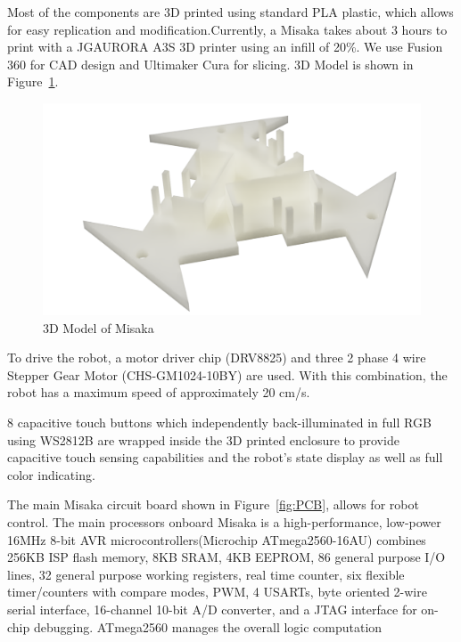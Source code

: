 \documentclass[conference]{IEEEtran}
\begin{document}
Most of the components are 3D printed using standard PLA plastic, which allows for easy replication and modification.Currently, a Misaka takes about 3 hours to print with a JGAURORA A3S 3D printer using an infill of 20\%. We use Fusion 360 for CAD design and Ultimaker Cura for slicing. 3D Model is shown in Figure~\ref{fig:3DModel}.

\begin{figure}[htbp]
    \centering
    \includegraphics[width=\columnwidth]{3DModel.png}
    \caption{3D Model of Misaka}
    \label{fig:3DModel}
\end{figure}

To drive the robot, a motor driver chip (DRV8825) and three 2 phase 4 wire Stepper Gear Motor (CHS-GM1024-10BY) are used. With this combination, the robot has a maximum speed of approximately 20 cm/s.

8 capacitive touch buttons which independently back-illuminated in full RGB using WS2812B are wrapped inside the 3D printed enclosure to provide capacitive touch sensing capabilities and the robot’s state display as well as full color indicating.

The main Misaka circuit board shown in Figure~\ref{fig:PCB}, allows for robot control. The main processors onboard Misaka is a high-performance, low-power 16MHz 8-bit AVR microcontrollers(Microchip ATmega2560-16AU) combines 256KB ISP flash memory, 8KB SRAM, 4KB EEPROM, 86 general purpose I/O lines, 32 general purpose working registers, real time counter, six flexible timer/counters with compare modes, PWM, 4 USARTs, byte oriented 2-wire serial interface, 16-channel 10-bit A/D converter, and a JTAG interface for on-chip debugging. ATmega2560 manages the overall logic computation
\end{document}
